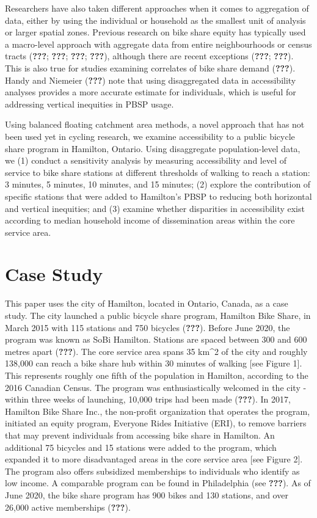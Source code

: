 \documentclass[]{elsarticle} %
\begin{document}
Researchers have also taken different approaches when it comes to
aggregation of data, either by using the individual or household as the
smallest unit of analysis or larger spatial zones. Previous research on
bike share equity has typically used a macro-level approach with
aggregate data from entire neighbourhoods or census tracts
({\textbf{???}}; {\textbf{???}}; {\textbf{???}}; {\textbf{???}}),
although there are recent exceptions ({\textbf{???}}; {\textbf{???}}).
This is also true for studies examining correlates of bike share demand
({\textbf{???}}). Handy and Niemeier ({\textbf{???}}) note that using
disaggregated data in accessibility analyses provides a more accurate
estimate for individuals, which is useful for addressing vertical
inequities in PBSP usage.

Using balanced floating catchment area methods, a novel approach that
has not been used yet in cycling research, we examine accessibility to a
public bicycle share program in Hamilton, Ontario. Using disaggregate
population-level data, we (1) conduct a sensitivity analysis by
measuring accessibility and level of service to bike share stations at
different thresholds of walking to reach a station: 3 minutes, 5
minutes, 10 minutes, and 15 minutes; (2) explore the contribution of
specific stations that were added to Hamilton's PBSP to reducing both
horizontal and vertical inequities; and (3) examine whether disparities
in accessibility exist according to median household income of
dissemination areas within the core service area.

\hypertarget{sec:study}{%
\section{Case Study}\label{sec:study}}

This paper uses the city of Hamilton, located in Ontario, Canada, as a
case study. The city launched a public bicycle share program, Hamilton
Bike Share, in March 2015 with 115 stations and 750 bicycles
({\textbf{???}}). Before June 2020, the program was known as SoBi
Hamilton. Stations are spaced between 300 and 600 metres apart
({\textbf{???}}). The core service area spans 35 km\^{}2 of the city and
roughly 138,000 can reach a bike share hub within 30 minutes of walking
{[}see Figure 1{]}. This represents roughly one fifth of the population
in Hamilton, according to the 2016 Canadian Census. The program was
enthusiastically welcomed in the city - within three weeks of launching,
10,000 trips had been made ({\textbf{???}}). In 2017, Hamilton Bike
Share Inc., the non-profit organization that operates the program,
initiated an equity program, Everyone Rides Initiative (ERI), to remove
barriers that may prevent individuals from accessing bike share in
Hamilton. An additional 75 bicycles and 15 stations were added to the
program, which expanded it to more disadvantaged areas in the core
service area {[}see Figure 2{]}. The program also offers subsidized
memberships to individuals who identify as low income. A comparable
program can be found in Philadelphia (see {\textbf{???}}). As of June
2020, the bike share program has 900 bikes and 130 stations, and over
26,000 active memberships ({\textbf{???}}).
\end{document}
